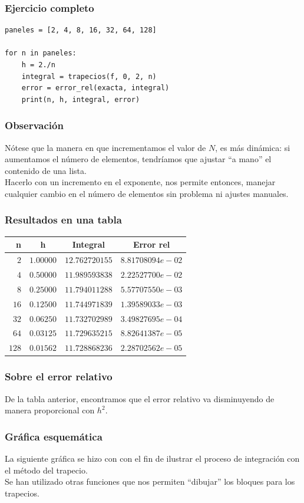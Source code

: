 \documentclass[12pt]{beamer}
\begin{document}
\begin{frame}[fragile]
\frametitle{Ejercicio completo}
\begin{lstlisting}[caption=Completamos el código y evaluamos el error]
paneles = [2, 4, 8, 16, 32, 64, 128]

for n in paneles:
    h = 2./n
    integral = trapecios(f, 0, 2, n)
    error = error_rel(exacta, integral)
    print(n, h, integral, error)
\end{lstlisting}
\end{frame}
\begin{frame}
\frametitle{Observación}
Nótese que la manera en que incrementamos el valor de $N$, es más dinámica: \pause si aumentamos el número de elementos, tendríamos que ajustar \enquote{a mano} el contenido de una lista.
\\
\bigskip
\pause 
Hacerlo con un incremento en el exponente, nos permite entonces, manejar cualquier cambio en el número de elementos sin problema ni ajustes manuales.
\end{frame}
\begin{frame}
\frametitle{Resultados en una tabla}
\begin{table}
\centering
\renewcommand{\arraystretch}{0.9}
\begin{tabular}{r | c | c | c} \hline
n & h & Integral & Error rel \\ \hline
$2$ & $1.00000$ & $12.762720155$ & $8.81708094e-02$ \\ \hline
$4$ & $0.50000$ & $11.989593838$ & $2.22527700e-02$ \\ \hline
$8$ & $0.25000$ & $11.794011288$ & $5.57707550e-03$ \\ \hline
$16$ & $0.12500$ & $11.744971839$ & $1.39589033e-03$ \\ \hline
$32$ & $0.06250$ & $11.732702989$ & $3.49827695e-04$ \\ \hline
$64$ & $0.03125$ & $11.729635215$ & $8.82641387e-05$ \\ \hline
$128$ & $0.01562$ & $11.728868236$ & $2.28702562e-05$ \\ \hline
\end{tabular}
\end{table}
\end{frame}
\begin{frame}
\frametitle{Sobre el error relativo}
De la tabla anterior, encontramos que el error relativo va disminuyendo de manera proporcional con $h^{2}$.
\end{frame}
\begin{frame}
\frametitle{Gráfica esquemática}
La siguiente gráfica se hizo con  con el fin de ilustrar el proceso de integración con el método del trapecio.
\\
\bigskip
\pause
Se han utilizado otras funciones que nos permiten \enquote{dibujar} los bloques para los trapecios.
\end{frame}
\end{document}
